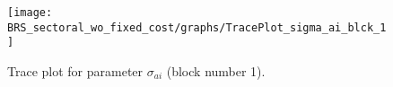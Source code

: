 \begin{figure}[H]
\centering
  \texttt{[image: BRS\_sectoral\_wo\_fixed\_cost/graphs/TracePlot\_sigma\_ai\_blck\_1]}\\
    \caption{Trace plot for parameter ${\sigma_{ai}}$ (block number 1).}
\end{figure}
